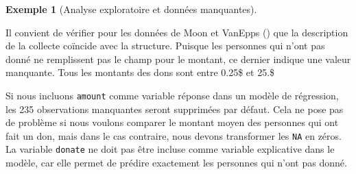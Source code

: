 \documentclass[
  11pt,
  letterpaper,
]{scrbook}
\newenvironment{Shaded}{\begin{snugshade}}{\end{snugshade}}
\newcommand{\AttributeTok}[1]{\textcolor[rgb]{0.40,0.45,0.13}{#1}}
\newcommand{\CommentTok}[1]{\textcolor[rgb]{0.37,0.37,0.37}{#1}}
\newcommand{\FunctionTok}[1]{\textcolor[rgb]{0.28,0.35,0.67}{#1}}
\newcommand{\NormalTok}[1]{\textcolor[rgb]{0.00,0.23,0.31}{#1}}
\newcommand{\StringTok}[1]{\textcolor[rgb]{0.13,0.47,0.30}{#1}}
\theoremstyle{plain}
\theoremstyle{plain}
\theoremstyle{definition}
\newtheorem{example}{Exemple}[chapter]
\theoremstyle{definition}
\theoremstyle{remark}
\begin{document}
\begin{example}[Analyse exploratoire et données
manquantes]\protect\hypertarget{exm-donnees-manquantes-moon}{}\label{exm-donnees-manquantes-moon}

Il convient de vérifier pour les données de Moon et VanEpps
() que la description de la
collecte coïncide avec la structure. Puisque les personnes qui n'ont pas
donné ne remplissent pas le champ pour le montant, ce dernier indique
une valeur manquante. Tous les montants des dons sont entre 0.25\$ et
25.\$

\begin{Shaded}
\end{Shaded}

Si nous incluons \texttt{amount} comme variable réponse dans un modèle
de régression, les 235 observations manquantes seront supprimées par
défaut. Cela ne pose pas de problème si nous voulons comparer le montant
moyen des personnes qui ont fait un don, mais dans le cas contraire,
nous devons transformer les \texttt{NA} en zéros. La variable
\texttt{donate} ne doit pas être incluse comme variable explicative dans
le modèle, car elle permet de prédire exactement les personnes qui n'ont
pas donné.

\end{example}
\end{document}
